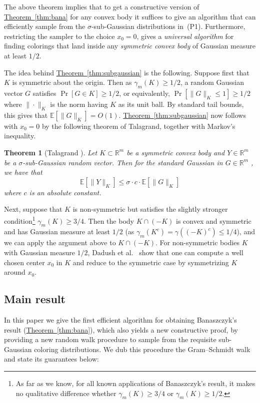 \documentclass[11pt]{article}
\numberwithin{equation}{section}
\newtheorem{theorem}{Theorem}[section]
\theoremstyle{definition}
\theoremstyle{plain}
\newcommand{\R}{\mathbb R}
\newcommand{\expref}[2]{\hyperref[#2]{#1~\ref{#2}}}
\newcommand\E{\mathbb{E}}
\begin{document}
The above theorem implies that to get a constructive version of
\expref{Theorem}{thm:bana} for any convex body it suffices to give an algorithm that
can efficiently sample from the $\sigma$-sub-Gaussian distributions
in~(P1). Furthermore, restricting the sampler to the choice $x_0 = 0$,
gives a \emph{universal algorithm} for finding colorings that land inside any
\emph{symmetric convex body} of Gaussian measure at least $1/2$.

The idea behind \expref{Theorem}{thm:subgaussian} is the following. Suppose first that $K$ is symmetric about the origin.
Then as $\gamma_m(K) \geq 1/2$, a random Gaussian vector $G$ satisfies $\Pr[G \in K] \geq 1/2$, or equivalently, $\Pr[ \|G\|_K \leq 1] \geq 1/2$ where $\| \cdot \|_K$ is the norm having $K$ as its unit ball. By standard tail bounds, this gives that $\E[\|G\|_K ] = O(1)$. \expref{Theorem}{thm:subgaussian} now follows with $x_0=0$ by the following theorem of Talagrand, together with Markov's inequality.

\begin{theorem}[Talagrand \cite{Talagrand05}] Let $K \subset \R^m$ be a symmetric convex body and $Y \in \R^m$ be a $\sigma$-sub-Gaussian random vector. Then for the standard Gaussian in $G \in \R^m$ , we have that
\[  \E[\|Y\|_K] \leq \sigma \cdot c \cdot \E[\|G\|_K]\]
where $c$ is an absolute constant.
\end{theorem}

Next, suppose that $K$ is non-symmetric but satisfies the slightly stronger condition\footnote{As far as we know, for all known applications of Banaszczyk's result, it makes no qualitative difference whether $\gamma_m(K) \geq 3/4$ or $\gamma_m(K) \geq 1/2$.} $\gamma_m(K) \geq 3/4$. Then the body $K \cap (-K)$ is convex and symmetric and has Gaussian measure at least $1/2$ (as $\gamma_m(K^c) = \gamma(
(-K)^c) \leq 1/4$), and we can apply the argument above to $K \cap (-K)$.
For non-symmetric bodies $K$ with Gaussian measure $1/2$,
Dadush et al.~\cite{DGLN16} show that one can compute a well chosen center $x_0$ in $K$ and reduce to the symmetric case by symmetrizing $K$ around $x_0$.

\subsection{Main result}
In this paper we give the first efficient algorithm for obtaining Banaszczyk's
result (\expref{Theorem}{thm:bana}), which also yields a new constructive proof, by
providing a new random walk procedure to sample from the requisite sub-Gaussian
coloring distributions. We dub this procedure the Gram--Schmidt walk and
state its guarantees below:
\end{document}
